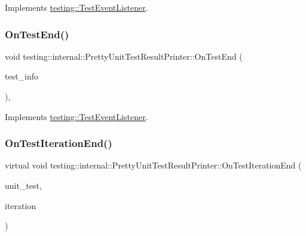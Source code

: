 Implements \mbox{\hyperlink{classtesting_1_1_test_event_listener_abb1c44525ef038500608b5dc2f17099b}{testing\+::\+Test\+Event\+Listener}}.

\mbox{\label{classtesting_1_1internal_1_1_pretty_unit_test_result_printer_a085f90bb9f3128d8d8864c19e1e188ef}} 
\subsubsection{\texorpdfstring{OnTestEnd()}{OnTestEnd()}\hspace{0.1cm}{\footnotesize\ttfamily [3/3]}}
{\footnotesize\ttfamily void testing\+::internal\+::\+Pretty\+Unit\+Test\+Result\+Printer\+::\+On\+Test\+End (\begin{DoxyParamCaption}\item[{const \mbox{\hyperlink{classtesting_1_1_test_info}{Test\+Info}} \&}]{test\+\_\+info }\end{DoxyParamCaption})\hspace{0.3cm}{\ttfamily [override]}, {\ttfamily [virtual]}}



Implements \mbox{\hyperlink{classtesting_1_1_test_event_listener_abb1c44525ef038500608b5dc2f17099b}{testing\+::\+Test\+Event\+Listener}}.

\mbox{\label{classtesting_1_1internal_1_1_pretty_unit_test_result_printer_a02ae3a9b477a559edeefe4f7c11134a2}} 
\subsubsection{\texorpdfstring{OnTestIterationEnd()}{OnTestIterationEnd()}\hspace{0.1cm}{\footnotesize\ttfamily [1/3]}}
{\footnotesize\ttfamily virtual void testing\+::internal\+::\+Pretty\+Unit\+Test\+Result\+Printer\+::\+On\+Test\+Iteration\+End (\begin{DoxyParamCaption}\item[{const \mbox{\hyperlink{classtesting_1_1_unit_test}{Unit\+Test}} \&}]{unit\+\_\+test,  }\item[{int}]{iteration }\end{DoxyParamCaption})\hspace{0.3cm}{\ttfamily [virtual]}}



